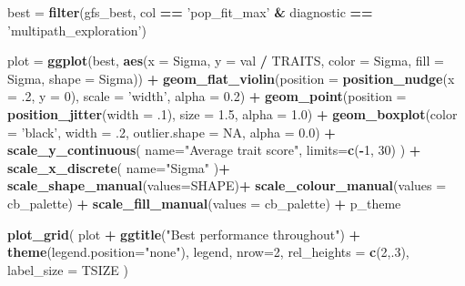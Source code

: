 \documentclass[]{book}
\newenvironment{Shaded}{\begin{snugshade}}{\end{snugshade}}
\newcommand{\DataTypeTok}[1]{\textcolor[rgb]{0.13,0.29,0.53}{#1}}
\newcommand{\DecValTok}[1]{\textcolor[rgb]{0.00,0.00,0.81}{#1}}
\newcommand{\FloatTok}[1]{\textcolor[rgb]{0.00,0.00,0.81}{#1}}
\newcommand{\KeywordTok}[1]{\textcolor[rgb]{0.13,0.29,0.53}{\textbf{#1}}}
\newcommand{\NormalTok}[1]{#1}
\newcommand{\OperatorTok}[1]{\textcolor[rgb]{0.81,0.36,0.00}{\textbf{#1}}}
\newcommand{\OtherTok}[1]{\textcolor[rgb]{0.56,0.35,0.01}{#1}}
\newcommand{\StringTok}[1]{\textcolor[rgb]{0.31,0.60,0.02}{#1}}
\begin{document}
\begin{Shaded}
\begin{Highlighting}[]
\NormalTok{best =}\StringTok{ }\KeywordTok{filter}\NormalTok{(gfs_best, col }\OperatorTok{==}\StringTok{ 'pop_fit_max'} \OperatorTok{&}\StringTok{ }\NormalTok{diagnostic }\OperatorTok{==}\StringTok{ 'multipath_exploration'}\NormalTok{)}

\NormalTok{plot =}\StringTok{ }\KeywordTok{ggplot}\NormalTok{(best, }\KeywordTok{aes}\NormalTok{(}\DataTypeTok{x =}\NormalTok{ Sigma, }\DataTypeTok{y =}\NormalTok{ val }\OperatorTok{/}\StringTok{ }\NormalTok{TRAITS, }\DataTypeTok{color =}\NormalTok{ Sigma, }\DataTypeTok{fill =}\NormalTok{ Sigma, }\DataTypeTok{shape =}\NormalTok{ Sigma)) }\OperatorTok{+}
\StringTok{  }\KeywordTok{geom_flat_violin}\NormalTok{(}\DataTypeTok{position =} \KeywordTok{position_nudge}\NormalTok{(}\DataTypeTok{x =} \FloatTok{.2}\NormalTok{, }\DataTypeTok{y =} \DecValTok{0}\NormalTok{), }\DataTypeTok{scale =} \StringTok{'width'}\NormalTok{, }\DataTypeTok{alpha =} \FloatTok{0.2}\NormalTok{) }\OperatorTok{+}
\StringTok{  }\KeywordTok{geom_point}\NormalTok{(}\DataTypeTok{position =} \KeywordTok{position_jitter}\NormalTok{(}\DataTypeTok{width =} \FloatTok{.1}\NormalTok{), }\DataTypeTok{size =} \FloatTok{1.5}\NormalTok{, }\DataTypeTok{alpha =} \FloatTok{1.0}\NormalTok{) }\OperatorTok{+}
\StringTok{  }\KeywordTok{geom_boxplot}\NormalTok{(}\DataTypeTok{color =} \StringTok{'black'}\NormalTok{, }\DataTypeTok{width =} \FloatTok{.2}\NormalTok{, }\DataTypeTok{outlier.shape =} \OtherTok{NA}\NormalTok{, }\DataTypeTok{alpha =} \FloatTok{0.0}\NormalTok{) }\OperatorTok{+}
\StringTok{  }\KeywordTok{scale_y_continuous}\NormalTok{(}
    \DataTypeTok{name=}\StringTok{"Average trait score"}\NormalTok{,}
    \DataTypeTok{limits=}\KeywordTok{c}\NormalTok{(}\OperatorTok{-}\DecValTok{1}\NormalTok{, }\DecValTok{30}\NormalTok{)}
\NormalTok{  ) }\OperatorTok{+}
\StringTok{  }\KeywordTok{scale_x_discrete}\NormalTok{(}
    \DataTypeTok{name=}\StringTok{"Sigma"}
\NormalTok{  )}\OperatorTok{+}
\StringTok{  }\KeywordTok{scale_shape_manual}\NormalTok{(}\DataTypeTok{values=}\NormalTok{SHAPE)}\OperatorTok{+}
\StringTok{  }\KeywordTok{scale_colour_manual}\NormalTok{(}\DataTypeTok{values =}\NormalTok{ cb_palette) }\OperatorTok{+}
\StringTok{  }\KeywordTok{scale_fill_manual}\NormalTok{(}\DataTypeTok{values =}\NormalTok{ cb_palette) }\OperatorTok{+}
\StringTok{  }\NormalTok{p_theme}

\KeywordTok{plot_grid}\NormalTok{(}
\NormalTok{  plot }\OperatorTok{+}
\StringTok{    }\KeywordTok{ggtitle}\NormalTok{(}\StringTok{"Best performance throughout"}\NormalTok{) }\OperatorTok{+}
\StringTok{    }\KeywordTok{theme}\NormalTok{(}\DataTypeTok{legend.position=}\StringTok{"none"}\NormalTok{),}
\NormalTok{  legend,}
  \DataTypeTok{nrow=}\DecValTok{2}\NormalTok{,}
  \DataTypeTok{rel_heights =} \KeywordTok{c}\NormalTok{(}\DecValTok{2}\NormalTok{,.}\DecValTok{3}\NormalTok{),}
  \DataTypeTok{label_size =}\NormalTok{ TSIZE}
\NormalTok{)}
\end{Highlighting}
\end{Shaded}
\end{document}
